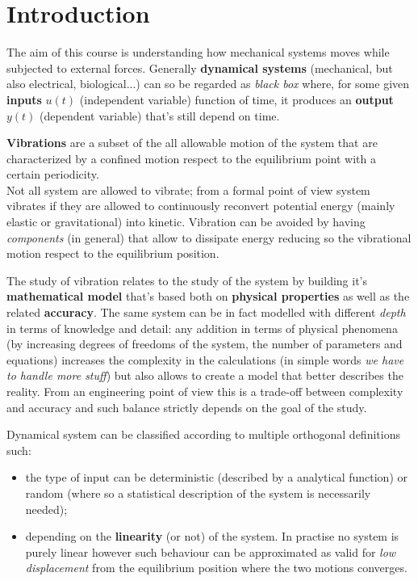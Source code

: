 \chapter{Introduction}
	The aim of this course is understanding how mechanical systems moves while subjected to external forces. Generally \textbf{dynamical systems} (mechanical, but also electrical, biological...) can so be regarded as \textit{black box} where, for some given \textbf{inputs} $u(t)$ (independent variable) function of time, it produces an \textbf{output} $y(t)$ (dependent variable) that's still depend on time.
	
	\textbf{Vibrations} are a subset of the all allowable motion of the system that are characterized by a confined motion respect to the equilibrium point with a certain periodicity.\\
	Not all system are allowed to vibrate; from a formal point of view system vibrates if they are allowed to continuously reconvert potential energy (mainly elastic or gravitational) into kinetic. Vibration can be avoided by having \textit{components} (in general) that allow to dissipate energy reducing so the vibrational motion respect to the equilibrium position.
	
	\vspace{3mm}
	
	The study of vibration relates to the study of the system by building it's \textbf{mathematical model} that's based both on \textbf{physical properties} as well as the related \textbf{accuracy}. The same system can be in fact modelled with different \textit{depth} in terms of knowledge and detail: any addition in terms of physical phenomena (by increasing degrees of freedoms of the system, the number of parameters and equations) increases the complexity in the calculations (in simple words \textit{we have to handle more stuff}) but also allows to create a model that better describes the reality. From an engineering point of view this is a trade-off between complexity and accuracy and such balance strictly depends on the goal of the study.
	
	\vspace{3mm}
	
	Dynamical system can be classified according to multiple orthogonal definitions such:
	\begin{itemize}
		\item the type of input can be deterministic (described by a analytical function) or random (where so a statistical description of the system is necessarily needed);
		\item depending on the \textbf{linearity} (or not) of the system. In practise no system is purely linear however such behaviour can be approximated as valid for \textit{low displacement} from the equilibrium position where the two motions converges.
	\end{itemize}
	
	
	
	
	
	
	
	
	
	
	
	
	
